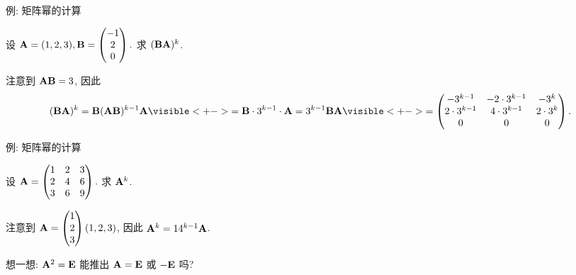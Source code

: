\begin{frame}{例: 矩阵幂的计算}
	\onslide<+->
	\begin{example}
		设 
		${\mathbf{A}}=(1,2,3),{\mathbf{B}}=\begin{pmatrix}
			-1\\2\\0
		\end{pmatrix}.$
		求 $({\mathbf{B}}{\mathbf{A}})^k$.
	\end{example}
	\onslide<+->
	\begin{solution}
		注意到 ${\mathbf{A}}{\mathbf{B}}=3$, 因此
		\[(\bfB\bfA)^k=\bfB(\bfA\bfB)^{k-1}\bfA
			\visible<+->{=\bfB\cdot 3^{k-1}\cdot \bfA
				=3^{k-1}\bfB\bfA}
			\visible<+->{=\begin{pmatrix}
				-3^{k-1}&-2\cdot 3^{k-1}&-3^k\\
				2\cdot 3^{k-1}&4\cdot 3^{k-1}&2\cdot3^{k}\\
				0&0&0
			\end{pmatrix}.}\]
	\end{solution}
\end{frame}


\begin{frame}{例: 矩阵幂的计算}
	\onslide<+->
	\begin{exercise}
		设 
		${\mathbf{A}}=\begin{pmatrix}
			1&2&3\\
			2&4&6\\
			3&6&9
		\end{pmatrix}.$
		求 ${\mathbf{A}}^k$.
	\end{exercise}
	\onslide<+->
	\begin{answer}
		注意到 ${\mathbf{A}}=\begin{pmatrix}
			1\\2\\3
		\end{pmatrix}(1,2,3)$, 因此 ${\mathbf{A}}^k=14^{k-1}{\mathbf{A}}$.
	\end{answer}
	\onslide<+->
	想一想: ${\mathbf{A}}^2={\mathbf{E}}$ 能推出 ${\mathbf{A}}={\mathbf{E}}$ 或 $-{\mathbf{E}}$ 吗?
\end{frame}


